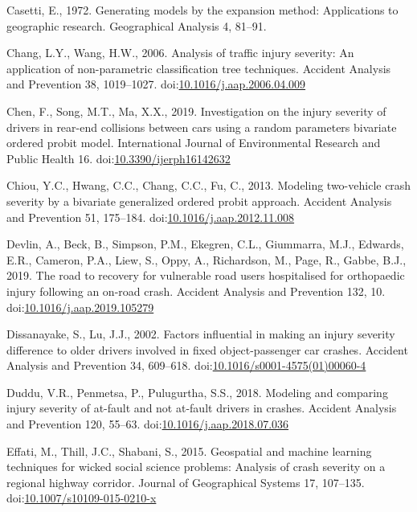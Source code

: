 \documentclass[]{elsarticle} %
\begin{document}
\leavevmode\hypertarget{ref-Casetti1972generating}{}%
Casetti, E., 1972. Generating models by the expansion method:
Applications to geographic research. Geographical Analysis 4, 81--91.

\leavevmode\hypertarget{ref-Chang2006analysis}{}%
Chang, L.Y., Wang, H.W., 2006. Analysis of traffic injury severity: An
application of non-parametric classification tree techniques. Accident
Analysis and Prevention 38, 1019--1027.
doi:\href{https://doi.org/10.1016/j.aap.2006.04.009}{10.1016/j.aap.2006.04.009}

\leavevmode\hypertarget{ref-Chen2019investigation}{}%
Chen, F., Song, M.T., Ma, X.X., 2019. Investigation on the injury
severity of drivers in rear-end collisions between cars using a random
parameters bivariate ordered probit model. International Journal of
Environmental Research and Public Health 16.
doi:\href{https://doi.org/10.3390/ijerph16142632}{10.3390/ijerph16142632}

\leavevmode\hypertarget{ref-Chiou2013modeling}{}%
Chiou, Y.C., Hwang, C.C., Chang, C.C., Fu, C., 2013. Modeling
two-vehicle crash severity by a bivariate generalized ordered probit
approach. Accident Analysis and Prevention 51, 175--184.
doi:\href{https://doi.org/10.1016/j.aap.2012.11.008}{10.1016/j.aap.2012.11.008}

\leavevmode\hypertarget{ref-Devlin2019road}{}%
Devlin, A., Beck, B., Simpson, P.M., Ekegren, C.L., Giummarra, M.J.,
Edwards, E.R., Cameron, P.A., Liew, S., Oppy, A., Richardson, M., Page,
R., Gabbe, B.J., 2019. The road to recovery for vulnerable road users
hospitalised for orthopaedic injury following an on-road crash. Accident
Analysis and Prevention 132, 10.
doi:\href{https://doi.org/10.1016/j.aap.2019.105279}{10.1016/j.aap.2019.105279}

\leavevmode\hypertarget{ref-Dissanayake2002factors}{}%
Dissanayake, S., Lu, J.J., 2002. Factors influential in making an injury
severity difference to older drivers involved in fixed object-passenger
car crashes. Accident Analysis and Prevention 34, 609--618.
doi:\href{https://doi.org/10.1016/s0001-4575(01)00060-4}{10.1016/s0001-4575(01)00060-4}

\leavevmode\hypertarget{ref-Duddu2018modeling}{}%
Duddu, V.R., Penmetsa, P., Pulugurtha, S.S., 2018. Modeling and
comparing injury severity of at-fault and not at-fault drivers in
crashes. Accident Analysis and Prevention 120, 55--63.
doi:\href{https://doi.org/10.1016/j.aap.2018.07.036}{10.1016/j.aap.2018.07.036}

\leavevmode\hypertarget{ref-Effati2015geospatial}{}%
Effati, M., Thill, J.C., Shabani, S., 2015. Geospatial and machine
learning techniques for wicked social science problems: Analysis of
crash severity on a regional highway corridor. Journal of Geographical
Systems 17, 107--135.
doi:\href{https://doi.org/10.1007/s10109-015-0210-x}{10.1007/s10109-015-0210-x}
\end{document}
